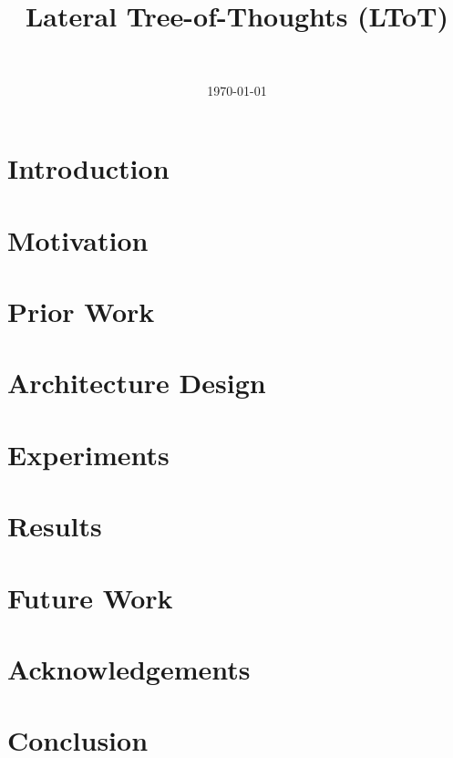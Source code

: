 \documentclass[onecolumn]{IEEEtran}
\title{Lateral Tree-of-Thoughts (LToT)}
\date{\today}
\author{
    \IEEEauthorblockN{Abhinav Madahar}\\
    \IEEEauthorblockA{
        Independent Computer Scientist\\
        Email: \href{mailto:abhinavmadahar@gmail.com}{abhinavmadahar@gmail.com}
    }
}
\begin{document}
\maketitle

\begin{abstract}
\end{abstract}

\section{Introduction}
\label{section:introduction}


\section{Motivation}
\label{section:motivation}


\section{Prior Work}
\label{section:prior-work}


\section{Architecture Design}
\label{section:architecture-design}


\section{Experiments}
\label{section:experiments}


\section{Results}
\label{section:results}


\section{Future Work}
\label{section:future-work}


\section{Acknowledgements}
\label{section:acknowledgements}


\section{Conclusion}
\label{section:conclusion}


\printbibliography
\end{document}
